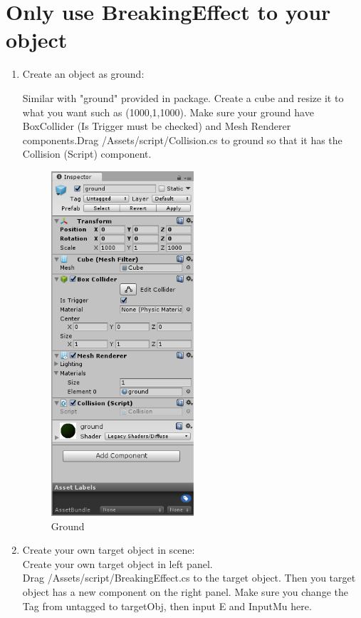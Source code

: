 \documentclass[12pt, titlepage]{article}
\begin{document}
	\section{Only use BreakingEffect to your object} \label{SecUse}
	\begin{enumerate}
	\item {Create an object as ground:}
	
	Similar with "ground" provided in package. Create a cube and resize it to what you want such as (1000,1,1000). Make sure your ground have BoxCollider (Is Trigger must be checked) and Mesh Renderer components.Drag /Assets/script/Collision.cs to ground so that it has the Collision (Script) component.
	
	\begin{figure}[H]
		\centering
		\includegraphics[width=0.5\textwidth]{./Ground.png}
		\caption{Ground}
		\label{FigGround}
	\end{figure}
	
	\item {Create your own target object in scene:}\\
	Create your own target object in left panel.\\
	Drag /Assets/script/BreakingEffect.cs to the target object. Then you target object has a new component on the right panel. Make sure you change the Tag from untagged to targetObj, then input E and InputMu here.
	

\end{enumerate}
\end{document}
